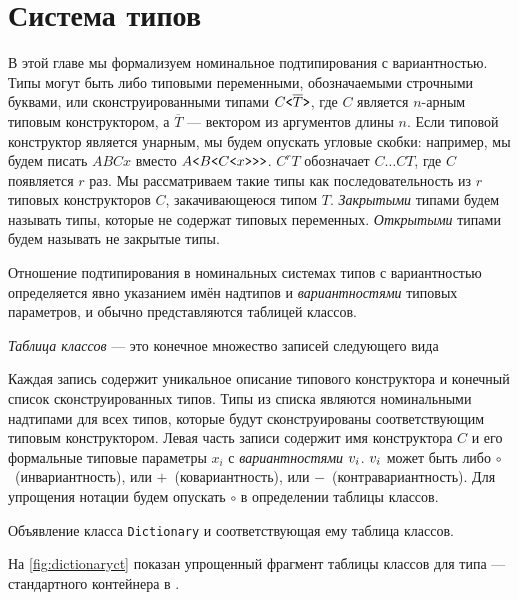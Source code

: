 \section{Система типов\protect\footnotemark}

В этой главе мы формализуем номинальное подтипирования с вариантностью. Типы могут быть либо типовыми переменными, обозначаемыми строчными буквами, или сконструированными типами $C\texttt{<}\overline{T}\texttt{>}$, где $C$ является $n$-арным типовым конструктором, а $\overline{T}$ --- вектором из аргументов длины $n$. Если типовой конструктор является унарным, мы будем опускать угловые скобки: например, мы будем писать $ABCx$ вместо $A\texttt{<}B\texttt{<}C\texttt{<}x\texttt{>}\texttt{>}\texttt{>}$. $C^{r}T$ обозначает $C\ldots CT$, где $C$ появляется $r$ раз. Мы рассматриваем такие типы как последовательность из $r$ типовых конструкторов $C$, закачивающеюся типом $T$. \emph{Закрытыми} типами будем называть типы, которые не содержат типовых переменных. \emph{Открытыми} типами будем называть не закрытые типы.

Отношение подтипирования в номинальных системах типов с вариантностью определяется явно указанием имён надтипов и \emph{вариантностями} типовых параметров, и обычно представляются таблицей классов.

\begin{defn}
\emph{Таблица классов} --- это конечное множество записей следующего вида

Каждая запись содержит уникальное описание типового конструктора и конечный список сконструированных типов. Типы из списка являются номинальными надтипами для всех типов, которые будут сконструированы соответствующим типовым конструктором. Левая часть записи содержит имя конструктора $C$ и его формальные типовые параметры $x_{i}$ с \emph{вариантностями} $v_i$. \(v_i\) может быть либо \(\circ\)~(инвариантность), или \(+\)~(ковариантность), или \(-\)~(контравариантность). Для упрощения нотации будем опускать $\circ$ в определении таблицы классов.
\end{defn}

\begin{Listing}
\small{}
\caption{Объявление класса \texttt{Dictionary} и соответствующая ему таблица классов.}
\label{fig:dictionaryct}
\end{Listing}

\begin{exmp}
На \autoref{fig:dictionaryct} показан упрощенный фрагмент таблицы классов для типа \onector{\dictionarytype}{\xtype, \ytype} --- стандартного контейнера в \dotnet{}.
\end{exmp}

